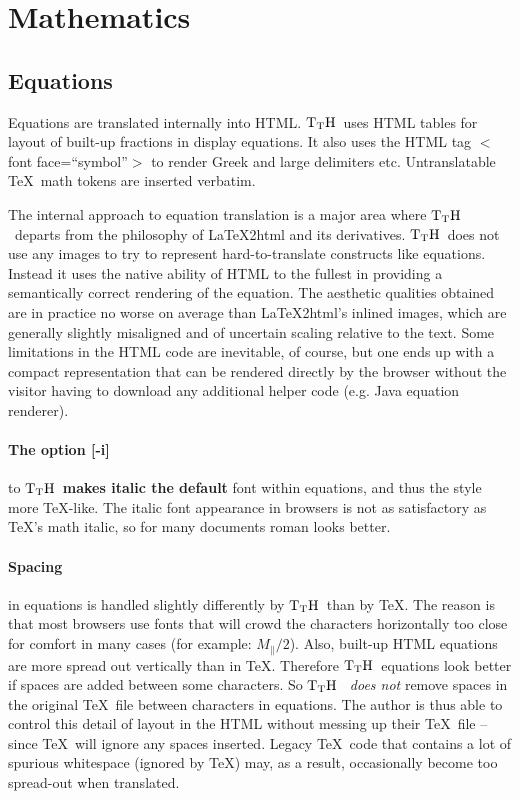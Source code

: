 \documentclass[12pt]{article}
\def\TtH{$\rm{}T_TH$}
\begin{document}
\ifx\TtMgold\undefined
\section{Mathematics}

\subsection{Equations}

 Equations are translated internally into HTML. \TtH\ uses HTML tables
 for layout of built-up fractions in display equations. It also uses
 the HTML tag $<$font face=``symbol''$>$ to render Greek and large
 delimiters etc. Untranslatable \TeX\ math tokens are inserted
 verbatim.

The internal approach to equation translation is a major area where
\TtH\ departs from the philosophy of \LaTeX2html and its
derivatives. \TtH\ 
does not use any images to try to represent hard-to-translate
constructs like equations.  Instead it uses the native ability of HTML
to the fullest in providing a semantically correct rendering of the
equation. The aesthetic qualities obtained are in practice no worse on
average than \LaTeX2html's inlined images, which are generally slightly
misaligned and of uncertain scaling relative to the text. Some
limitations in the HTML code are inevitable, of course, but one ends
up with a compact representation that can be rendered directly by the
browser without the visitor having to download any additional helper
code (e.g. Java equation renderer).

\paragraph{The option [-i]} to \TtH\ {\bf makes italic the default}
font within equations, and thus the style more \TeX-like. The italic
font appearance in browsers is not as satisfactory as \TeX's math
italic, so for many documents roman looks better.

\paragraph{Spacing} in equations is handled slightly differently by \TtH\ than
by \TeX. The reason is that most browsers use fonts that will crowd the
characters horizontally too close for comfort in many cases (for
example: $M_\parallel/2$). Also, built-up HTML equations are more
spread out vertically than in \TeX. Therefore \TtH\ equations look better
if spaces are added between some characters. So \TtH\ {\em
does not} remove spaces in the original \TeX\ file between characters in
equations. The author is thus able to control this detail of layout in
the HTML without messing up their \TeX\ file -- since \TeX\ will ignore
any spaces inserted. Legacy \TeX\ code that contains a lot of spurious
whitespace (ignored by \TeX) may, as a result, occasionally become too
spread-out when translated.
\end{document}
